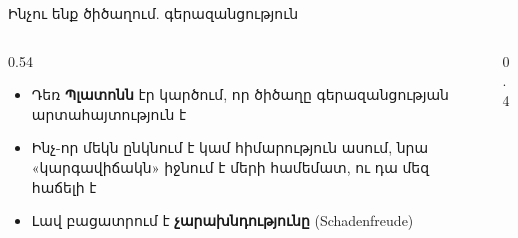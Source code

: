 \begin{frame}{Ինչու ենք ծիծաղում. գերազանցություն}
  \begin{columns}[c]
    \begin{column}{0.54\textwidth}
      \begin{itemize}
        \item Դեռ \textbf{Պլատոնն} էր կարծում, որ ծիծաղը գերազանցության արտահայտություն է
        \item<2-> Ինչ-որ մեկն ընկնում է կամ հիմարություն ասում, նրա «կարգավիճակն» իջնում է մերի համեմատ, ու դա մեզ հաճելի է
        \item<3-> Լավ բացատրում է \textbf{չարախնդությունը} (Schadenfreude)
      \end{itemize}
    \end{column}
    \begin{column}{0.4\textwidth}
    \end{column}
  \end{columns}
\end{frame}

